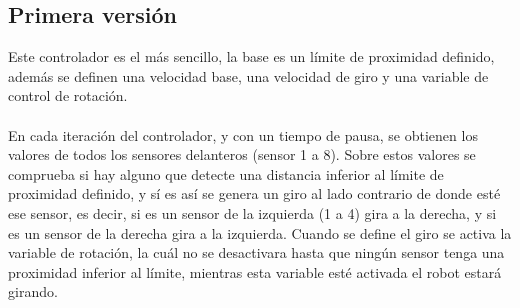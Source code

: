 \documentclass[14pt]{extarticle}
\theoremstyle{definition}
\theoremstyle{remark}
\begin{document}
\subsection{Primera versión}\label{subsec:primeraversion}
Este controlador es el más sencillo, la base es un límite de proximidad definido, además se definen una velocidad base, una velocidad de giro y una variable de control de rotación.\\\\
 En cada iteración del controlador, y con un tiempo de pausa, se obtienen los valores de todos los sensores delanteros (sensor 1 a 8). Sobre estos valores se comprueba si hay alguno que detecte una distancia inferior al límite de proximidad definido, y sí es así se genera un giro al lado contrario de donde esté ese sensor, es decir, si es un sensor de la izquierda (1 a 4) gira a la derecha, y si es un sensor de la derecha  gira a la izquierda. Cuando se define el giro se activa la variable de rotación, la cuál no se desactivara hasta que ningún sensor tenga una proximidad inferior al límite, mientras esta variable esté activada el robot estará girando.
\end{document}
